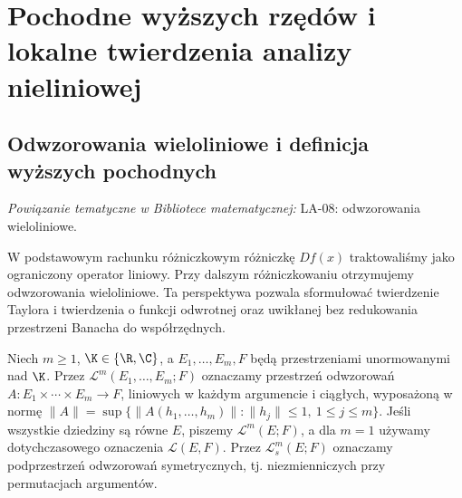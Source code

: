 \setcounter{section}{14}
\section{Pochodne wyższych rzędów i lokalne twierdzenia analizy nieliniowej}
\label{sec:wyzsze-pochodne15}

\providecommand{\atlasref}[2]{#2}


\subsection{Odwzorowania wieloliniowe i definicja wyższych pochodnych}

\noindent\emph{Powiązanie tematyczne w Bibliotece matematycznej:} \atlasref{LA-08::def:lin8-wieloliniowe}{LA-08: odwzorowania wieloliniowe}.


W podstawowym rachunku różniczkowym różniczkę $Df(x)$ traktowaliśmy jako ograniczony operator liniowy. Przy dalszym różniczkowaniu otrzymujemy odwzorowania wieloliniowe. Ta perspektywa pozwala sformułować twierdzenie Taylora i twierdzenia o funkcji odwrotnej oraz uwikłanej bez redukowania przestrzeni Banacha do współrzędnych.

\begin{definicja}
\label{def:multilinear15}
Niech $m\ge1$, $\K\in\{\R,\C\}$, a $E_1,\ldots,E_m,F$ będą przestrzeniami unormowanymi nad $\K$. Przez $\mathcal L^m(E_1,\ldots,E_m;F)$ oznaczamy przestrzeń odwzorowań $A:E_1\times\cdots\times E_m\to F$, liniowych w każdym argumencie i ciągłych, wyposażoną w normę
$\|A\|=\sup\{\|A(h_1,\ldots,h_m)\|:\|h_j\|\le1,\ 1\le j\le m\}$. Jeśli wszystkie dziedziny są równe $E$, piszemy $\mathcal L^m(E;F)$, a dla $m=1$ używamy dotychczasowego oznaczenia $\mathcal L(E,F)$. Przez $\mathcal L^m_s(E;F)$ oznaczamy podprzestrzeń odwzorowań symetrycznych, tj. niezmienniczych przy permutacjach argumentów.
\end{definicja}

